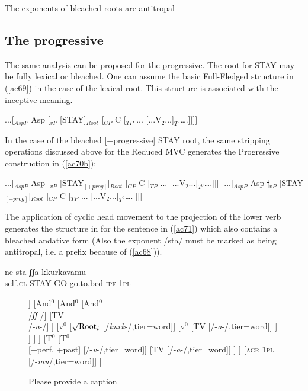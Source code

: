 \documentclass[output=paper]{langscibook}
\begin{document}
\ea\label{ac68}
The exponents of bleached roots are antitropal
\z

\subsection{The progressive}

The same analysis can be proposed for the progressive.  The root for STAY may be fully lexical or bleached. One can assume the basic Full-Fledged structure in (\ref{ac69}) in the case of the lexical root.  This structure is associated with the inceptive meaning.

\ea \label{ac69}...[$_{AspP}$ Asp [$_{vP}$ [STAY]$_{Root}$ [$_{CP}$ C [$_{TP}$ ... [...V$_2$...]$_{T^0}$….]]]]
\z

In the case of the bleached [+progressive] STAY root, the same stripping operations discussed above for the Reduced MVC generates the Progressive construction in (\ref{ac70b}):

\ea \label{ac70}
    \ea \label{ac70a}...[$_{AspP}$ Asp [$_{vP}$ [STAY$_{[+prog]}$]$_{Root}$ [$_{CP}$ C [$_{TP}$ ... [...V$_2$...]$_{T^0}$….]]]]
    \ex \label{ac70b}...[$_{AspP}$ Asp \sout{[$_{vP}$} [STAY$_{[+prog]}$]$_{Root}$ \sout{[$_{CP}$ C [$_{TP}$ ...} [...V$_2$...]$_{T^0}$….]]]]
    \z
\z

The application of cyclic head movement to the projection of the lower verb generates the structure in  for the sentence in (\ref{ac71}) which also contains a bleached andative form (Also the exponent /sta/ must be marked as being antitropal, i.e. a prefix because of (\ref{ac68})). 

\ea \label{ac71}
    \gll ne     sta    ʃʃa  kkurkavamu\\
   self.\textsc{cl} STAY GO  go.to.bed-\textsc{ipf}-\textsc{1pl}\\
\z

\begin{figure}
  \caption{\label{ac72}\color{red}Please provide a caption}
  \begin{forest}
  	[T$^0$
  		[T$^0$
	  		[$\surd{} + \text{prog}$
	  			[$\surd{} + \text{prog}$
	  				[$\surd{} + \text{prog}$\\/\textit{st}-/]
	  				[TV\\/-\textit{a}-/]
	  			]
	  			[And$^0$
	  				[And$^0$
	  					[And$^0$\\/\textit{ʃʃ}-/]
	  					[TV\\/-\textit{a}-/]
	  				]
	  				[v$^0$
	  					[$\surd\text{Root}_i$ [/\textit{kurk}-/,tier=word]]
	  					[v$^0$
	  						[TV [/-\textit{a}-/,tier=word]]
	  					]
	  				]
	  			]
	  		]
	  		[T$^0$
	  			[T$^0$\\{[−perf, +past]} [/-\textit{v}-/,tier=word]]
	  			[TV [/-\textit{a}-/,tier=word]]
	  		]
  		]
  		[\textsc{agr 1pl} [/-\textit{mu}/,tier=word]]
  	]
  \end{forest}
\end{figure}
\end{document}
